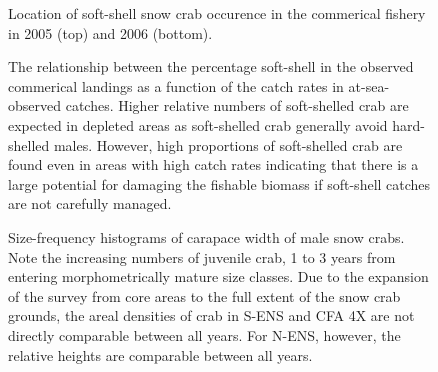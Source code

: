 \documentclass[11pt]{article}
\newcommand*{\D}{.}  %
\begin{document}
\newpage
\begin{figure}[h]
\begin{center}
\begin{minipage}{5in}
\end{minipage}
\begin{minipage}{5in}
\end{minipage}
\end{center}
\caption{Location of soft-shell snow crab occurence in the commerical fishery in 2005 (top) and 2006 (bottom).}
\label{map.softshell}
\end{figure}


\newpage
\begin{figure}[h]
\begin{center}
\begin{minipage}{6.5in}
\end{minipage}
\end{center}
\caption{The relationship between the percentage soft-shell in the observed commerical landings as a function of the catch rates in at-sea-observed catches. Higher relative numbers of soft-shelled crab are expected in depleted areas as soft-shelled crab generally avoid hard-shelled males. However, high proportions of soft-shelled crab are found even in areas with high catch rates indicating that there is a large potential for damaging the fishable biomass if soft-shell catches are not carefully managed.}
\label{softshell.cpue}
\end{figure}




\clearpage \newpage
\begin{figure}[ht]
\begin{center}
\end{center}
\caption{Size-frequency histograms of carapace width of male snow crabs. Note the increasing numbers of juvenile crab, 1 to 3 years from entering morphometrically mature size classes. Due to the expansion of the survey from core areas to the full extent of the snow crab grounds, the areal densities of crab in S-ENS and CFA 4X are not directly comparable between all years. For N-ENS, however, the relative heights are comparable between all years. }
\label{hist.male.cw}
\end{figure}
\end{document}
